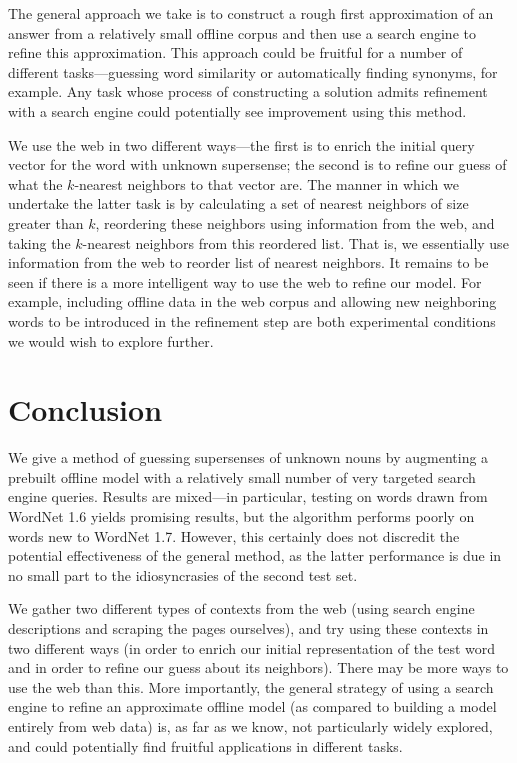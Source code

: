\documentclass{article}
\begin{document}
The general approach we take is to construct a rough first approximation of an answer from a relatively small offline corpus and then use a search engine to refine this approximation.
This approach could be fruitful for a number of different tasks---guessing word similarity or automatically finding synonyms, for example.
Any task whose process of constructing a solution admits refinement with a search engine  could potentially see improvement using this method.

We use the web in two different ways---the first is to enrich the initial query vector for the word with unknown supersense; the second is to refine our guess of what the $k$-nearest neighbors to that vector are.
The manner in which we undertake the latter task is by calculating a set of nearest neighbors of size greater than $k$, reordering these neighbors using information from the web, and taking the $k$-nearest neighbors from this reordered list.
That is, we essentially use information from the web to reorder list of nearest neighbors.
It remains to be seen if there is a more intelligent way to use the web to  refine our model.
For example, including offline data in the web corpus and allowing new neighboring words to be introduced in the refinement step are both experimental conditions we would wish to explore further.

\section{Conclusion}


We give a method of guessing supersenses of unknown nouns by augmenting a prebuilt offline model with a relatively small number of very targeted search engine queries.
Results are mixed---in particular, testing on words drawn from WordNet 1.6 yields promising results, but the algorithm performs poorly on words new to WordNet 1.7.
However, this certainly does not discredit the potential effectiveness of the general method, as the latter performance is due in no small part to the idiosyncrasies of the second test set.

We gather two different types of contexts from the web (using search engine descriptions and scraping the pages ourselves), and try using these contexts in two different ways (in order to enrich our initial representation of the test word and in order to refine our guess about its neighbors).
There may be more ways to use the web than this.
More importantly, the general strategy of using a search engine to refine an approximate offline model (as compared to building a model entirely from web data) is, as far as we know, not particularly widely explored, and could potentially find fruitful applications in different tasks.



{}

\end{document}
